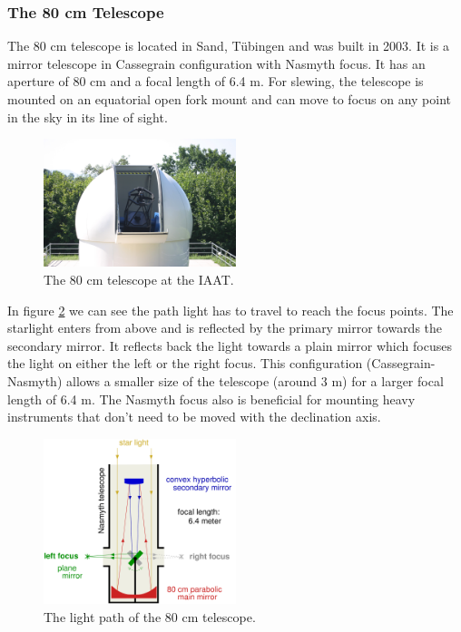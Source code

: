 \documentclass[12pt,a4paper]{article}
\begin{document}
  \subsubsection{The 80 cm Telescope}
  \label{sec:80tele}
    The 80 cm telescope is located in Sand, Tübingen and was built in 2003. It is a mirror telescope in Cassegrain configuration with Nasmyth focus. It has an aperture of 80 cm and 
    a focal length of 6.4 m. For slewing, the telescope is mounted on an equatorial open fork mount and can move to focus on any point in the sky in its line of sight.
    \begin{figure}[H]
      \centering
      \includegraphics[width=0.5\textwidth]{./Pictures/2004_img_0962.jpg}
      \caption{The 80 cm telescope at the IAAT.}
      \label{fig:80cm}
    \end{figure}
    In figure \ref{fig:80cm_lp} we can see the path light has to travel to reach the focus points. The starlight enters from above and is reflected by the primary mirror towards the 
    secondary mirror. It reflects back the light towards a plain mirror which focuses the light on either the left or the right focus. This configuration (Cassegrain-Nasmyth) allows a smaller size of the telescope
    (around 3 m) for a larger focal length of 6.4 m. The Nasmyth focus also is beneficial for mounting heavy instruments that don't need to be moved with the declination axis. 
    \begin{figure}[H]
      \centering
      \includegraphics[width=0.5\textwidth]{Pictures/Nasmyth2.pdf}
      \caption{The light path of the 80 cm telescope.}
      \label{fig:80cm_lp}
    \end{figure}
\end{document}
